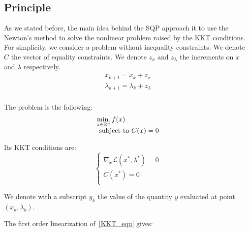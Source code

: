 \subsection{Principle}
\label{sub:principle}

As we stated before, the main idea behind the SQP approach it to use the Newton's method to solve the nonlinear problem raised by the KKT conditions.
For simplicity, we consider a problem without inequality constraints.
We denote $C$ the vector of equality constraints.
We denote $z_x$ and $z_\lambda$ the increments on $x$ and $\lambda$ respectively.
\begin{equation}
  \begin{array}{l}
    x_{k+1} = x_k + z_x\\
    \lambda_{k+1} = \lambda_k+z_\lambda\\
  \end{array}
\end{equation}

The problem is the following:
\begin{equation}
  \begin{array}{l}
    \operatorname*{min.}\limits_{x\in\mathbb{R}^n}{f(x)} \\
    \text{ subject to } C(x) = 0
  \end{array}
\end{equation}

Its KKT conditions are:
\begin{equation}
  \label{KKT_equ}
  \left\{
\begin{array}{ll}
  \nabla_x\mathcal{L}(x^*,\lambda^*) = 0\\
  C(x^*) = 0\\
\end{array}
\right.
\end{equation}

We denote with a subscript $y_k$ the value of the quantity $y$ evaluated at point $(x_k, \lambda_k)$.

The first order linearization of~\ref{KKT_equ} gives:


